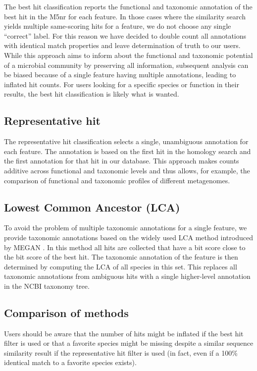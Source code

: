 \documentclass[12pt,fullpage]{report}
\begin{document}
The best hit classification reports the functional and taxonomic annotation of the best hit in the M5nr for each feature. In those cases where the similarity search yields multiple same-scoring hits for a feature, we do not choose any single ``correct'' label. For this reason we have decided to double count all annotations with identical match properties and leave determination of truth to our users. While this approach aims to inform about the functional and taxonomic potential of a microbial community by preserving all information, subsequent analysis can be biased because of a single feature having multiple annotations, leading to inflated hit counts. For users looking for a specific species or function in their results, the best hit classification is likely what is wanted.
\subsection{Representative hit}

The representative hit classification selects a single, unambiguous annotation for each feature. The annotation is based on the first hit in the homology search and the first annotation for that hit in our database. This approach makes counts additive across functional and taxonomic levels and thus allows, for example, the comparison of functional and taxonomic profiles of different metagenomes.
\subsection{Lowest Common Ancestor (LCA)}
\label{section:LCA}
To avoid the problem of multiple taxonomic annotations for a single feature, we provide taxonomic annotations based on the widely used LCA method introduced by MEGAN \cite{MEGAN}. In this method all hits are collected that have a bit score close to the bit score of the best hit. The taxonomic annotation of the feature is then determined by computing the LCA of all species in this set. This replaces all taxonomic annotations from ambiguous hits with a single higher-level annotation in the NCBI taxonomy tree.
\subsection{Comparison of methods}
Users should be aware that the number of hits might be inflated if the best hit filter is used or that a favorite species might be missing despite a similar sequence similarity result if the representative hit filter is used (in fact, even if a 100\% identical match to a favorite species exists).
\end{document}
